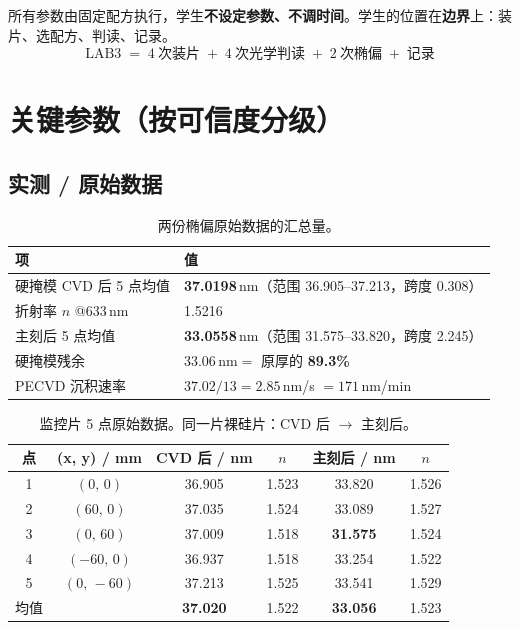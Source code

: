 \documentclass[UTF8,a4paper,11pt,fontset=windows]{ctexart}
\newcommand{\nm}{\ensuremath{\,\mathrm{nm}}}
\begin{document}
\begin{keybox}[关于学生角色的核心认知]
所有参数由固定配方执行，学生\textbf{不设定参数、不调时间}。学生的位置在\textbf{边界}上：装片、选配方、判读、记录。
$$\text{LAB3} \;=\; 4\ \text{次装片} \;+\; 4\ \text{次光学判读} \;+\; 2\ \text{次椭偏} \;+\; \text{记录}$$
\end{keybox}

\section{关键参数（按可信度分级）}

\subsection{实测 / 原始数据}

\begin{table}[h]
\centering
\small
\begin{tabularx}{\textwidth}{@{}>{\raggedright\arraybackslash}p{6.6cm} X@{}}
\toprule
\textbf{项} & \textbf{值} \\
\midrule
硬掩模 CVD 后 5 点均值 & \textbf{37.0198\nm}（范围 36.905--37.213，跨度 0.308） \\
折射率 $n$ @633\nm & 1.5216 \\
主刻后 5 点均值 & \textbf{33.0558\nm}（范围 31.575--33.820，跨度 2.245） \\
硬掩模残余 & 33.06\nm $=$ 原厚的 \textbf{89.3\%} \\
PECVD 沉积速率 & $37.02/13 = 2.85\nm$/s $=171$\,nm/min \\
\bottomrule
\end{tabularx}
\caption{两份椭偏原始数据的汇总量。}
\end{table}

\begin{table}[h]
\centering
\small
\begin{tabular}{@{}cccccc@{}}
\toprule
\textbf{点} & \textbf{(x, y) / mm} & \textbf{CVD 后 / nm} & \textbf{$n$} & \textbf{主刻后 / nm} & \textbf{$n$} \\
\midrule
1 & $(0,\,0)$      & 36.905 & 1.523 & 33.820 & 1.526 \\
2 & $(60,\,0)$     & 37.035 & 1.524 & 33.089 & 1.527 \\
3 & $(0,\,60)$     & 37.009 & 1.518 & \textbf{31.575} & 1.524 \\
4 & $(-60,\,0)$    & 36.937 & 1.518 & 33.254 & 1.522 \\
5 & $(0,\,-60)$    & 37.213 & 1.525 & 33.541 & 1.529 \\
\midrule
均值 & & \textbf{37.020} & 1.522 & \textbf{33.056} & 1.523 \\
\bottomrule
\end{tabular}
\caption{监控片 5 点原始数据。同一片裸硅片：CVD 后 $\to$ 主刻后。}
\end{table}
\end{document}
